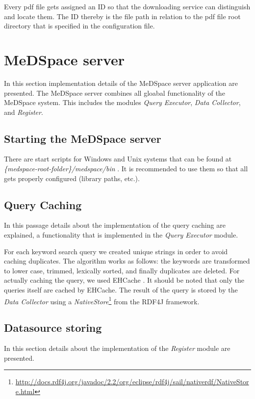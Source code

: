 Every pdf file gets assigned an ID so that the downloading service can distinguish and locate them. The ID thereby is the file path in relation to the pdf file root directory that is specified in the configuration file.

\section{MeDSpace server}

In this section implementation details of the MeDSpace server application are presented. The MeDSpace server combines all gloabal functionality of the MeDSpace system. This includes the modules \emph{Query Executor}, \emph{Data Collector}, and \emph{Register}.

\subsection{Starting the MeDSpace server}

There are start scripts for Windows and Unix systems that can be found at \\
\emph{\{medspace-root-folder\}/medspace/bin }. It is recommended to use them so that all gets properly configured (library paths, etc.).


\subsection{Query Caching}
In this passage details about the implementation of the query caching are explained, a functionality that is implemented in the \emph{Query Executor} module.

For each keyword search query we created unique strings in order to avoid caching duplicates.
The algorithm works as follows: the keywords are transformed to lower case, trimmed, lexically sorted, and finally duplicates are deleted.
For actually caching the query, we used EHCache \cite{EHCache}. 
It should be noted that only the queries itself are cached by EHCache. The result of the query is stored by the \emph{Data Collector} using a \emph{NativeStore}\footnote{\url{http://docs.rdf4j.org/javadoc/2.2/org/eclipse/rdf4j/sail/nativerdf/NativeStore.html}} from the RDF4J framework.

\subsection{Datasource storing}
In this section details about the implementation of the \emph{Register} module are presented.

